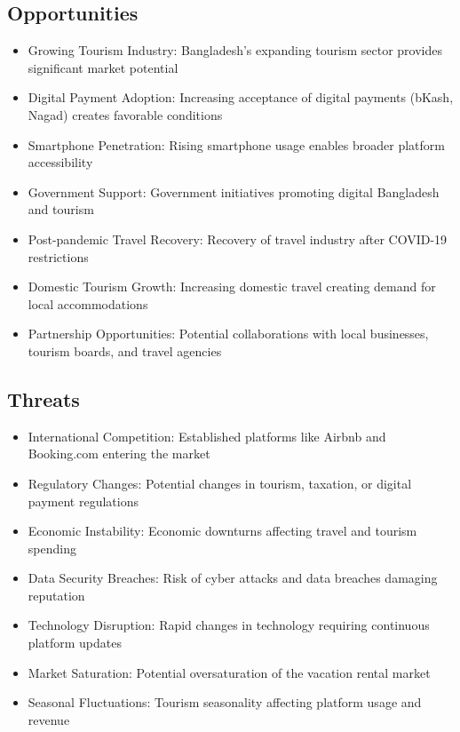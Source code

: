 \documentclass[12pt,a4paper]{report}
\begin{document}
\subsection{Opportunities}
\begin{itemize}
    \item Growing Tourism Industry: Bangladesh's expanding tourism sector provides significant market potential
    \item Digital Payment Adoption: Increasing acceptance of digital payments (bKash, Nagad) creates favorable conditions
    \item Smartphone Penetration: Rising smartphone usage enables broader platform accessibility
    \item Government Support: Government initiatives promoting digital Bangladesh and tourism
    \item Post-pandemic Travel Recovery: Recovery of travel industry after COVID-19 restrictions
    \item Domestic Tourism Growth: Increasing domestic travel creating demand for local accommodations
    \item Partnership Opportunities: Potential collaborations with local businesses, tourism boards, and travel agencies
\end{itemize}

\subsection{Threats}
\begin{itemize}
    \item International Competition: Established platforms like Airbnb and Booking.com entering the market
    \item Regulatory Changes: Potential changes in tourism, taxation, or digital payment regulations
    \item Economic Instability: Economic downturns affecting travel and tourism spending
    \item Data Security Breaches: Risk of cyber attacks and data breaches damaging reputation
    \item Technology Disruption: Rapid changes in technology requiring continuous platform updates
    \item Market Saturation: Potential oversaturation of the vacation rental market
    \item Seasonal Fluctuations: Tourism seasonality affecting platform usage and revenue
\end{itemize}
\end{document}
